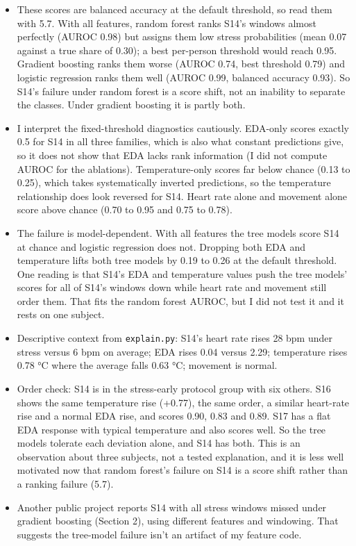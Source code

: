 \documentclass[11pt]{article}
\providecommand{\tightlist}{\setlength{\itemsep}{2pt}\setlength{\parskip}{0pt}}
\begin{document}
\begin{itemize}
\tightlist
\item
  These scores are balanced accuracy at the default threshold, so read
  them with 5.7. With all features, random forest ranks S14's windows
  almost perfectly (AUROC 0.98) but assigns them low stress
  probabilities (mean 0.07 against a true share of 0.30); a best
  per-person threshold would reach 0.95. Gradient boosting ranks them
  worse (AUROC 0.74, best threshold 0.79) and logistic regression ranks
  them well (AUROC 0.99, balanced accuracy 0.93). So S14's failure under
  random forest is a score shift, not an inability to separate the
  classes. Under gradient boosting it is partly both.
\item
  I interpret the fixed-threshold diagnostics cautiously. EDA-only
  scores exactly 0.5 for S14 in all three families, which is also what
  constant predictions give, so it does not show that EDA lacks rank
  information (I did not compute AUROC for the ablations).
  Temperature-only scores far below chance (0.13 to 0.25), which takes
  systematically inverted predictions, so the temperature relationship
  does look reversed for S14. Heart rate alone and movement alone score
  above chance (0.70 to 0.95 and 0.75 to 0.78).
\item
  The failure is model-dependent. With all features the tree models
  score S14 at chance and logistic regression does not. Dropping both
  EDA and temperature lifts both tree models by 0.19 to 0.26 at the
  default threshold. One reading is that S14's EDA and temperature
  values push the tree models' scores for all of S14's windows down
  while heart rate and movement still order them. That fits the random
  forest AUROC, but I did not test it and it rests on one subject.
\item
  Descriptive context from \texttt{explain.py}: S14's heart rate rises
  28 bpm under stress versus 6 bpm on average; EDA rises 0.04 versus
  2.29; temperature rises 0.78 °C where the average falls 0.63 °C;
  movement is normal.
\item
  Order check: S14 is in the stress-early protocol group with six
  others. S16 shows the same temperature rise (+0.77), the same order, a
  similar heart-rate rise and a normal EDA rise, and scores 0.90, 0.83
  and 0.89. S17 has a flat EDA response with typical temperature and
  also scores well. So the tree models tolerate each deviation alone,
  and S14 has both. This is an observation about three subjects, not a
  tested explanation, and it is less well motivated now that random
  forest's failure on S14 is a score shift rather than a ranking failure
  (5.7).
\item
  Another public project reports S14 with all stress windows missed
  under gradient boosting (Section 2), using different features and
  windowing. That suggests the tree-model failure isn't an artifact of
  my feature code.
\end{itemize}
\end{document}
